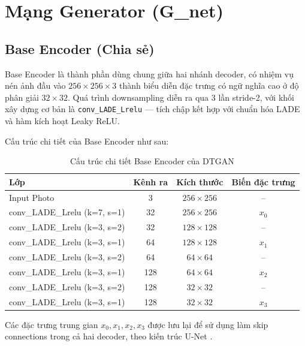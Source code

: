 \newpage
\section{Mạng Generator (G\_net)}
\label{sec:generator}

\subsection{Base Encoder (Chia sẻ)}
\label{subsec:base_encoder}

Base Encoder là thành phần dùng chung giữa hai nhánh decoder, có nhiệm vụ nén ảnh đầu vào $256 \times 256 \times 3$ thành biểu diễn đặc trưng có ngữ nghĩa cao ở độ phân giải $32 \times 32$. Quá trình downsampling diễn ra qua 3 lần stride-2, với khối xây dựng cơ bản là \texttt{conv\_LADE\_Lrelu} --- tích chập kết hợp với chuẩn hóa LADE và hàm kích hoạt Leaky ReLU.

Cấu trúc chi tiết của Base Encoder như sau:

\begin{table}[H]
\caption{Cấu trúc chi tiết Base Encoder của DTGAN}
\label{tab:base_encoder}
\centering
\begin{tabular}{|l|c|c|c|}
\hline
\textbf{Lớp} & \textbf{Kênh ra} & \textbf{Kích thước} & \textbf{Biến đặc trưng} \\
\hline
Input Photo & 3 & $256 \times 256$ & -- \\
\hline
conv\_LADE\_Lrelu (k=7, s=1) & 32 & $256 \times 256$ & $x_0$ \\
\hline
conv\_LADE\_Lrelu (k=3, s=2) & 32 & $128 \times 128$ & -- \\
\hline
conv\_LADE\_Lrelu (k=3, s=1) & 64 & $128 \times 128$ & $x_1$ \\
\hline
conv\_LADE\_Lrelu (k=3, s=2) & 64 & $64 \times 64$ & -- \\
\hline
conv\_LADE\_Lrelu (k=3, s=1) & 128 & $64 \times 64$ & $x_2$ \\
\hline
conv\_LADE\_Lrelu (k=3, s=2) & 128 & $32 \times 32$ & -- \\
\hline
conv\_LADE\_Lrelu (k=3, s=1) & 128 & $32 \times 32$ & $x_3$ \\
\hline
\end{tabular}
\end{table}

Các đặc trưng trung gian $x_0, x_1, x_2, x_3$ được lưu lại để sử dụng làm skip connections trong cả hai decoder, theo kiến trúc U-Net \cite{Hasan2019}.

